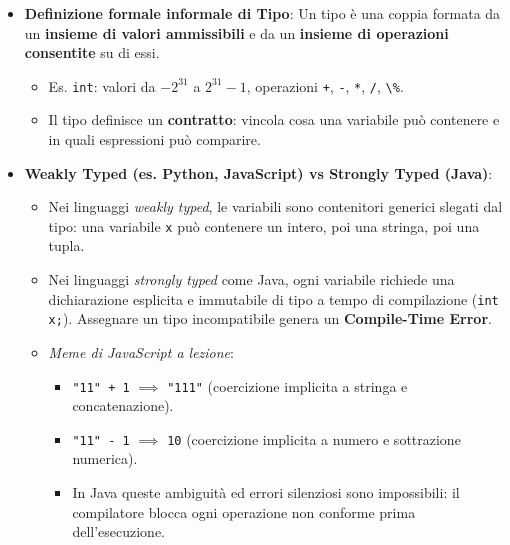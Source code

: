\documentclass[11pt,a4paper,oneside]{report}
\newcommand{\passthrough}[1]{#1}
\providecommand{\tightlist}{\setlength{\itemsep}{0pt}\setlength{\parskip}{0pt}}
\begin{document}
\begin{itemize}
\tightlist
\item
  \textbf{Definizione formale informale di Tipo}: Un tipo è una coppia
  formata da un \textbf{insieme di valori ammissibili} e da un
  \textbf{insieme di operazioni consentite} su di essi.

  \begin{itemize}
  \tightlist
  \item
    Es. \passthrough{\lstinline!int!}: valori da \(-2^{31}\) a
    \(2^{31}-1\), operazioni \passthrough{\lstinline!+!},
    \passthrough{\lstinline!-!}, \passthrough{\lstinline!*!},
    \passthrough{\lstinline!/!}, \passthrough{\lstinline!\%!}.
  \item
    Il tipo definisce un \textbf{contratto}: vincola cosa una variabile
    può contenere e in quali espressioni può comparire.
  \end{itemize}
\item
  \textbf{Weakly Typed (es. Python, JavaScript) vs Strongly Typed
  (Java)}:

  \begin{itemize}
  \tightlist
  \item
    Nei linguaggi \emph{weakly typed}, le variabili sono contenitori
    generici slegati dal tipo: una variabile \passthrough{\lstinline!x!}
    può contenere un intero, poi una stringa, poi una tupla.
  \item
    Nei linguaggi \emph{strongly typed} come Java, ogni variabile
    richiede una dichiarazione esplicita e immutabile di tipo a tempo di
    compilazione (\passthrough{\lstinline!int x;!}). Assegnare un tipo
    incompatibile genera un \textbf{Compile-Time Error}.
  \item
    \emph{Meme di JavaScript a lezione}:

    \begin{itemize}
    \tightlist
    \item
      \passthrough{\lstinline!"11" + 1!} \(\implies\)
      \passthrough{\lstinline!"111"!} (coercizione implicita a stringa e
      concatenazione).
    \item
      \passthrough{\lstinline!"11" - 1!} \(\implies\)
      \passthrough{\lstinline!10!} (coercizione implicita a numero e
      sottrazione numerica).
    \item
      In Java queste ambiguità ed errori silenziosi sono impossibili: il
      compilatore blocca ogni operazione non conforme prima
      dell'esecuzione.
    \end{itemize}
  \end{itemize}
\end{itemize}
\end{document}
